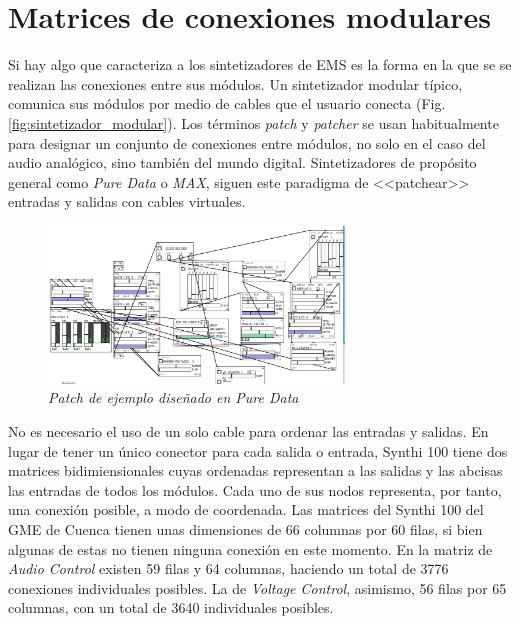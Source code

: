\section{Matrices de conexiones modulares}

Si hay algo que caracteriza a los sintetizadores de EMS es la forma en la que se se realizan las conexiones entre sus módulos. Un sintetizador modular típico, comunica sus módulos por medio de cables que el usuario conecta (Fig. \ref{fig:sintetizador_modular}). Los términos \textit{patch} y \textit{patcher} se usan habitualmente para designar un conjunto de conexiones entre módulos, no solo en el caso del audio analógico, sino también del mundo digital. Sintetizadores de propósito general como \textit{Pure Data} o \textit{MAX}, siguen este paradigma de <<patchear>> entradas y salidas con cables virtuales.
	
\begin{figure}
	\centering
	\includegraphics[width=0.7\textwidth]{images/pd_patch_example}
	\caption[\textit{Patch de ejemplo diseñado en \textit{Pure Data}}]{\textit{Patch de ejemplo diseñado en \textit{Pure Data}}}
	\label{fig:pd_patch_example}
\end{figure}
	

No es necesario el uso de un solo cable para ordenar las entradas y salidas. En lugar de tener un único conector para cada salida o entrada, Synthi 100 tiene dos matrices bidimiensionales cuyas ordenadas representan a las salidas y las abcisas las entradas de todos los módulos. Cada uno de sus nodos representa, por tanto, una conexión posible, a modo de coordenada. Las matrices del Synthi 100 del GME de Cuenca tienen unas dimensiones de 66 columnas por 60 filas, si bien algunas de estas no tienen ninguna conexión en este momento. En la matriz de \textit{Audio Control} existen 59 filas y 64 columnas, haciendo un total de 3776 conexiones individuales posibles. La de \textit{Voltage Control}, asimismo, 56 filas por 65 columnas, con un total de 3640 individuales posibles.

